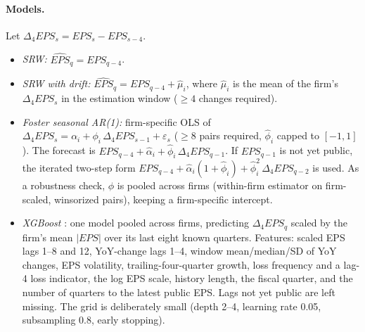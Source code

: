 \documentclass[11pt]{article}
\begin{document}
\paragraph{Models.} Let $\Delta_4 EPS_s=EPS_s-EPS_{s-4}$.
\begin{itemize}
\item[M1] \emph{SRW:} $\widehat{EPS}_q=EPS_{q-4}$.
\item[M2] \emph{SRW with drift:} $\widehat{EPS}_q=EPS_{q-4}+\hat\mu_i$, where $\hat\mu_i$ is the mean of the firm's
$\Delta_4 EPS_s$ in the estimation window ($\geq4$ changes required).
\item[M3] \emph{Foster seasonal AR(1):} firm-specific OLS of $\Delta_4 EPS_s=\alpha_i+\phi_i\,\Delta_4 EPS_{s-1}+\varepsilon_s$
($\geq8$ pairs required, $\hat\phi_i$ capped to $[-1,1]$). The forecast is
$EPS_{q-4}+\hat\alpha_i+\hat\phi_i\,\Delta_4 EPS_{q-1}$. If $EPS_{q-1}$ is not yet public, the iterated two-step form
$EPS_{q-4}+\hat\alpha_i(1+\hat\phi_i)+\hat\phi_i^2\,\Delta_4 EPS_{q-2}$ is used. As a robustness check, $\phi$ is pooled
across firms (within-firm estimator on firm-scaled, winsorized pairs), keeping a firm-specific intercept.
\item[M4] \emph{XGBoost} \citep{chen2016}: one model pooled across firms, predicting
$\Delta_4 EPS_q$ scaled by the firm's mean $|EPS|$ over its last eight known quarters. Features: scaled EPS lags 1--8
and 12, YoY-change lags 1--4, window mean/median/SD of YoY changes, EPS volatility, trailing-four-quarter growth,
loss frequency and a lag-4 loss indicator, the log EPS scale, history length, the fiscal quarter, and the number of
quarters to the latest public EPS. Lags not yet public are left missing. The grid is deliberately small (depth 2--4,
learning rate 0.05, subsampling 0.8, early stopping).
\end{itemize}
\end{document}
